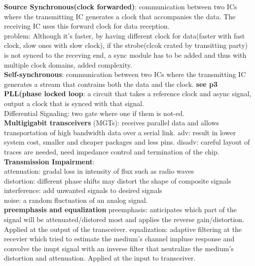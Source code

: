 \documentclass[10pt,landscape]{article}
\theoremstyle{definition}
\begin{document}
\begin{multicols}{3}
\textbf{Source Synchronous(clock forwarded)}: communication between two ICs where the transmitting IC generates a clock that accompanies the data. The receiving IC uses this forward clock for data reception. \\

problem: Although it's faster, by having different clock for data(faster with fast clock, slow ones with slow clock), if the strobe(clcok crated by transitting party) is not synced to the receving end, a sync module has to be added and thus with multiple clock domains, added complexity. \\

\textbf{Self-synchronous}: communication between two ICs where the transmitting IC generates a stream that contrains both the data and the clock. \textbf{see p3} \\

\textbf{PLL(phase locked loop}: a circuit that takes a reference clock and async signal, output a clock that is synced with that signal. \\

Differential Signaling: two gate where one if them is not-ed. \\

\textbf{Multigigabit transceivers} (MGTs): receives parallel data and allows transportation of high bandwidth data over a serial link. adv: result in lower system cost, smaller and cheaper packages and less pins. disadv: careful layout of traces are needed, need impedance control and termination of the chip. \\

\textbf{Transmission Impairment}:\\
attenuation: gradal loss in intensity of flux such as radio waves\\
distortion: different phase shifts may distort the shape of composite signals\\
interference: add unwanted signals to desired signals\\
noise: a random fluctuation of an analog signal. \\

\textbf{preemphasis and equalization}
preemphasis: anticipates which part of the signal will be attenuated/distored most and applies the reverse gain/distortion. Applied at the output of the transceiver. 
equalization: adaptive filtering at the recevier which tried to estimate the medium's channel impluse response and convolve the inupt signal with an inverse filter that neutralize the medium's distortion and attenuation. Applied at the input to transceiver. \\


\end{multicols}
\end{document}
